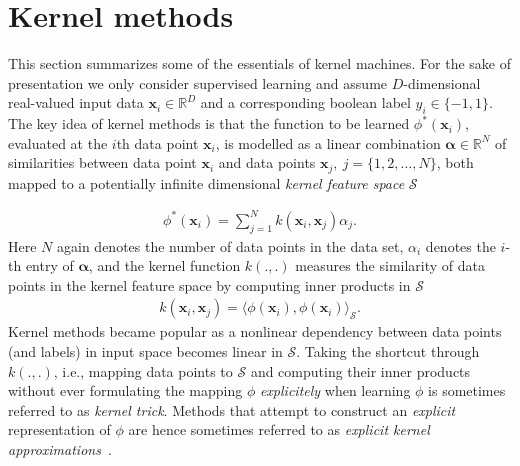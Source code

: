 \documentclass{article} %
\newcommand{\R}{\ensuremath{\mathds{R}}}
\newcommand{\va}{\boldsymbol{\alpha}}
\newcommand{\Bx}{\mathbf{x}}
\renewcommand{\vec}[1]{\mathbf{#1}}
\begin{document}
\section{Kernel methods}\label{sec:kernels}
This section summarizes some of the essentials of kernel machines. For the sake of presentation we only consider supervised learning and assume $D$-dimensional real-valued input data $\Bx_i\in\R^D$ and a corresponding boolean label $y_i\in\{-1,1\}$. The key idea of kernel methods is that the function to be learned $\phi^*(\Bx_i) $, evaluated at the $i$th data point $\Bx_i$, is modelled as a linear combination $\va\in\R^N$ of similarities between data point $\vec{x}_i$ and data points $\vec{x}_j,~j=\{1,2,\dots,N\}$, both mapped to a potentially infinite dimensional {\em kernel feature space} $\mathcal{S}$

\begin{align}\label{eq:kernel_trick}
\phi^*(\Bx_i)=\sum_{j=1}^N k(\Bx_i,\Bx_j)\alpha_j.
\end{align}
Here $N$ again denotes the number of data points in the data set, $\alpha_i$ denotes the $i$-th entry of $\va$, and the kernel function $k(.,.)$ measures the similarity of data points in the kernel feature space by computing inner products in $\mathcal{S}$
\begin{align}\label{eq:kernel_function}
k(\Bx_i,\Bx_j)=\langle \phi(\Bx_i), \phi(\Bx_i)\rangle_{\mathcal{S}}.
\end{align}
%
Kernel methods became popular as a nonlinear dependency between data points (and labels) in input space becomes linear in $\mathcal{S}$.
Taking the shortcut through $k(.,.)$, i.e., mapping data points to $\mathcal{S}$ and computing their inner products without ever formulating the mapping $\phi$ {\em explicitely} when learning $\phi$ is sometimes referred to as {\em kernel trick}. Methods that attempt to construct an {\em explicit} representation of $\phi$ are hence sometimes referred to as {\em explicit kernel approximations}~\cite{Dai2014}. 
\end{document}
